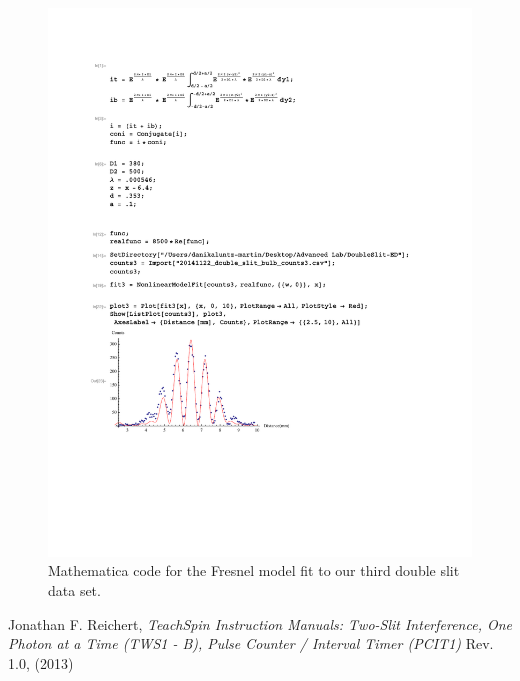 \documentclass[prb,preprint]{revtex4-1}
\begin{document}
\begin{figure}[h!]
\centering
\includegraphics[width=6in]{DoubleSlitFresnel3.pdf}
\caption{Mathematica code for the Fresnel model fit to our third double slit data set.}
\label{DoubleSlitFresnel3}
\end{figure}


\begin{thebibliography}{1}

 Jonathan F. Reichert, \textit{TeachSpin Instruction Manuals: Two-Slit Interference, One Photon at a Time (TWS1 - B), Pulse Counter / Interval Timer (PCIT1)} Rev. 1.0, (2013)

\end{thebibliography}
\end{document}

